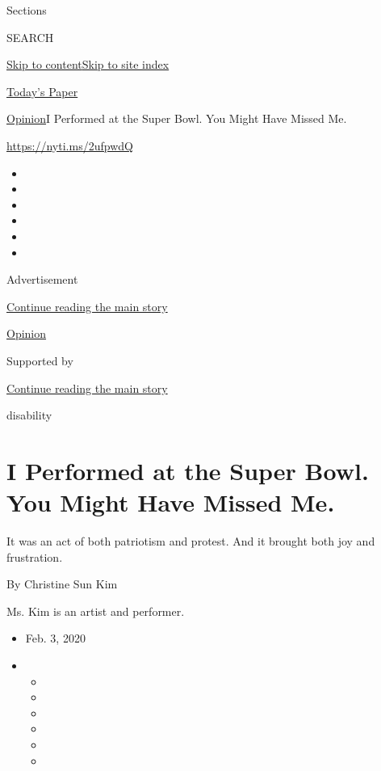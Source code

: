 Sections

SEARCH

\protect\hyperlink{site-content}{Skip to
content}\protect\hyperlink{site-index}{Skip to site index}

\href{https://myaccount.nytimes.com/auth/login?response_type=cookie\&client_id=vi}{}

\href{https://www.nytimes.com/section/todayspaper}{Today's Paper}

\href{/section/opinion}{Opinion}\textbar{}I Performed at the Super Bowl.
You Might Have Missed Me.

\href{https://nyti.ms/2ufpwdQ}{https://nyti.ms/2ufpwdQ}

\begin{itemize}
\item
\item
\item
\item
\item
\item
\end{itemize}

Advertisement

\protect\hyperlink{after-top}{Continue reading the main story}

\href{/section/opinion}{Opinion}

Supported by

\protect\hyperlink{after-sponsor}{Continue reading the main story}

disability

\hypertarget{i-performed-at-the-super-bowl-you-might-have-missed-me}{%
\section{I Performed at the Super Bowl. You Might Have Missed
Me.}\label{i-performed-at-the-super-bowl-you-might-have-missed-me}}

It was an act of both patriotism and protest. And it brought both joy
and frustration.

By Christine Sun Kim

Ms. Kim is an artist and performer.

\begin{itemize}
\item
  Feb. 3, 2020
\item
  \begin{itemize}
  \item
  \item
  \item
  \item
  \item
  \item
  \end{itemize}
\end{itemize}

